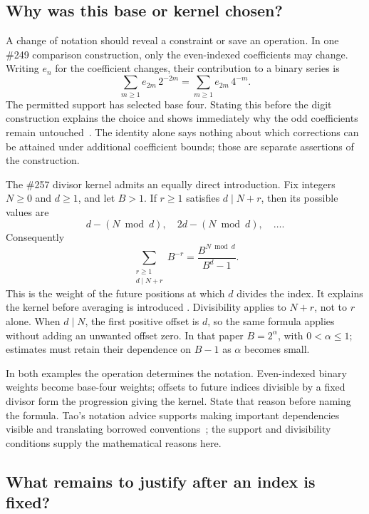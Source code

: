 \subsection{Why was this base or kernel chosen?}\label{sec:formula-choice}

A change of notation should reveal a constraint or save an operation. In one
\#249 comparison construction, only the even-indexed coefficients may change.
Writing $e_n$ for the coefficient changes, their contribution to a binary series is
\[
                 \sum_{m\ge1} e_{2m}\,2^{-2m}
                 =\sum_{m\ge1}e_{2m}\,4^{-m}.
\]
The permitted support has selected base four. Stating this before the digit
construction explains the choice and shows immediately why the odd coefficients
remain untouched~\cite[comparison-sequence construction]{paper249long}.
The identity alone says nothing about which corrections can be attained under
additional coefficient bounds; those are separate assertions of the construction.

The \#257 divisor kernel admits an equally direct introduction. Fix integers
$N\ge0$ and $d\ge1$, and let $B>1$. If $r\ge1$ satisfies $d\mid N+r$,
then its possible values are
\[
       d-(N\bmod d),\quad 2d-(N\bmod d),\quad\ldots.
\]
Consequently
\[
 \sum_{\substack{r\ge1\\d\mid N+r}}B^{-r}
 =\frac{B^{N\bmod d}}{B^d-1}.
\]
This is the weight of the future positions at which $d$ divides the index.
It explains the kernel before averaging is introduced
\cite[finite means for shifted divisor tails]{paper257}. Divisibility applies
to $N+r$, not to $r$ alone. When $d\mid N$, the first positive offset is $d$,
so the same formula applies without adding an unwanted offset zero. In that paper $B=2^\alpha$, with $0<\alpha\le1$; estimates
must retain their dependence on $B-1$ as $\alpha$ becomes small.

In both examples the operation determines the notation. Even-indexed
binary weights become base-four weights; offsets to future indices divisible
by a fixed divisor form the progression giving the kernel. State that
reason before naming the formula. Tao's notation advice supports making
important dependencies visible and translating borrowed conventions~\cite{tao-notation};
the support and divisibility conditions supply the mathematical reasons here.

\subsection{What remains to justify after an index is fixed?}\label{sec:fixed-partition}

